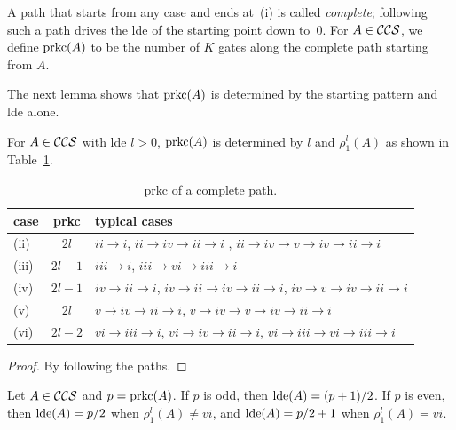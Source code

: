 \documentclass[reprint,amsmath,amssymb,aps,pra]{revtex4-2}
\begin{document}
A path that starts from any case and ends at~(i) is called
\emph{complete}; following such a path drives the lde of the starting
point down to~$0$. For $A \in {\mathcal{CCS}}$, we define $\operatorname{prkc}(A)$ to be
the number of $K$ gates along the complete path starting from $A$.

The next lemma shows that $\operatorname{prkc}(A)$ is determined by the starting
pattern and lde alone.

\begin{lemma}
  \label{lem:prkc}
  For $A \in {\mathcal{CCS}}$ with lde $l > 0$, $\operatorname{prkc}(A)$ is determined
  by $l$ and $\rho^l_1(A)$ as shown in Table~\ref{tab:rkc-path}.
  \begin{table}[h]
    \centering
    \begin{tabular}{l | c | p{7cm}}
      \hline
      case  & prkc   & typical cases       \\
      \hline
      (ii)  & $2l$   & $ii \rightarrow i$, $ii \rightarrow iv \rightarrow ii \rightarrow i$  , $ii \rightarrow iv \rightarrow v \rightarrow iv \rightarrow ii  \rightarrow i$               \\
      (iii) & $2l-1$ & $iii \rightarrow i$, $iii \rightarrow vi \rightarrow iii \rightarrow i$                                                                                              \\
      (iv)  & $2l-1$ & $iv \rightarrow ii \rightarrow i$, $iv \rightarrow ii \rightarrow iv \rightarrow ii  \rightarrow i$, $iv \rightarrow v \rightarrow iv \rightarrow ii  \rightarrow i$ \\
      (v)   & $2l$   & $v \rightarrow iv \rightarrow ii  \rightarrow i$, $v \rightarrow iv \rightarrow v \rightarrow iv \rightarrow ii  \rightarrow i$                                      \\
      (vi)  & $2l-2$ & $vi \rightarrow iii \rightarrow i$, $vi \rightarrow iv \rightarrow ii  \rightarrow i$, $vi \rightarrow iii \rightarrow vi \rightarrow iii  \rightarrow i$            \\
      \hline
    \end{tabular}    \caption{prkc of a complete path.}
    \label{tab:rkc-path}
  \end{table}
\end{lemma}
\begin{proof}
  By following the paths.
\end{proof}

\begin{corollary}
  Let $A \in {\mathcal{CCS}}$ and $p = \operatorname{prkc}(A)$. If $p$ is odd, then
  $\operatorname{lde}(A) = (p+1)/2$. If $p$ is even, then $\operatorname{lde}(A) = p/2$ when
  $\rho^l_1(A) \neq vi$, and $\operatorname{lde}(A) = p/2+1$ when
  $\rho^l_1(A) = vi$.
\end{corollary}
\end{document}

